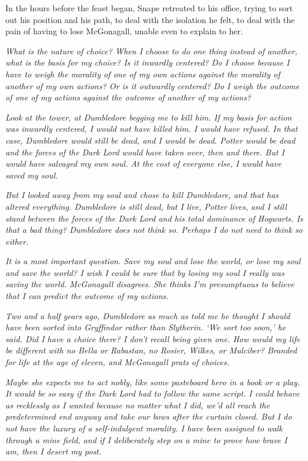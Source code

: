 \documentclass[a4paper,11pt]{article}
\begin{document}
In the hours before the feast began, Snape retreated to his office, trying to sort out his position and his path, to deal with the isolation he felt, to deal with the pain of having to lose McGonagall, unable even to explain to her.

\emph{What is the nature of choice? When I choose to do one thing instead of another, what is the basis for my choice? Is it inwardly centered? Do I choose because I have to weigh the morality of one of my own actions against the morality of another of my own actions? Or is it outwardly centered? Do I weigh the outcome of one of my actions against the outcome of another of my actions?}

\emph{Look at the tower, at Dumbledore begging me to kill him. If my basis for action was inwardly centered, I would not have killed him. I would have refused. In that case, Dumbledore would still be dead, and I would be dead. Potter would be dead and the forces of the Dark Lord would have taken over, then and there. But I would have salvaged my own soul. At the cost of everyone else, I would have saved my soul.}

\emph{But I looked away from my soul and chose to kill Dumbledore, and that has altered everything. Dumbledore is still dead, but I live, Potter lives, and I still stand between the forces of the Dark Lord and his total dominance of Hogwarts. Is that a bad thing? Dumbledore does not think so. Perhaps I do not need to think so either.}

\emph{It is a most important question. Save my soul and lose the world, or lose my soul and save the world? I wish I could be sure that by losing my soul I really was saving the world. McGonagall disagrees. She thinks I'm presumptuous to believe that I can predict the outcome of my actions.}

\emph{Two and a half years ago, Dumbledore as much as told me he thought I should have been sorted into Gryffindor rather than Slytherin. `We sort too soon,' he said. Did I have a choice there? I don't recall being given one. How would my life be different with no Bella or Rabastan, no Rosier, Wilkes, or Mulciber? Branded for life at the age of eleven, and McGonagall prats of choices.}

\emph{Maybe she expects me to act nobly, like some pasteboard hero in a book or a play. It would be so easy if the Dark Lord had to follow the same script. I could behave as recklessly as I wanted because no matter what I did, we'd all reach the predetermined end anyway and take our bows after the curtain closed. But I do not have the luxury of a self-indulgent morality. I have been assigned to walk through a mine field, and if I deliberately step on a mine to prove how brave I am, then I desert my post.}
\end{document}
